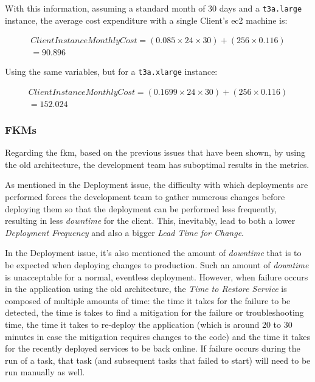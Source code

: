 With this information, assuming a standard month of 30 days and a \texttt{t3a.large} instance, the average cost expenditure with a single Client's \gls{ec2} machine is:

\begin{align}
    \label{eq:ec2-instance-cost-t3alarge}
    Client Instance Monthly Cost = (0.085 \times 24 \times  30) + (256 \times  0.116)\\
    = 90.896
    \end{align}

Using the same variables, but for a \texttt{t3a.xlarge} instance:

\begin{align}
    \label{eq:ec2-instance-cost-t3axlarge}
    Client Instance Monthly Cost = (0.1699 \times 24 \times  30) + (256 \times  0.116)\\
    = 152.024
\end{align}



\subsubsection{FKMs}\label{methodology:sss:fkms}

Regarding the \gls{fkm}, based on the previous issues that have been shown, by using the old architecture, the development team has suboptimal results in the metrics.

As mentioned in the Deployment issue, the difficulty with which deployments are performed forces the development team to gather numerous changes before deploying them so that the deployment can be performed less frequently, resulting in less \textit{downtime} for the client. This, inevitably, lead to both a lower \textit{Deployment Frequency} and also a bigger \textit{Lead Time for Change}.

In the Deployment issue, it's also mentioned the amount of \textit{downtime} that is to be expected when deploying changes to production. Such an amount of \textit{downtime} is unacceptable for a normal, eventless deployment. However, when failure occurs in the application using the old architecture, the \textit{Time to Restore Service} is composed of multiple amounts of time: the time it takes for the failure to be detected, the time is takes to find a mitigation for the failure or troubleshooting time, the time it takes to re-deploy the application (which is around 20 to 30 minutes in case the mitigation requires changes to the code) and the time it takes for the recently deployed services to be back online. If failure occurs during the run of a task, that task (and subsequent tasks that failed to start) will need to be run manually as well. 

